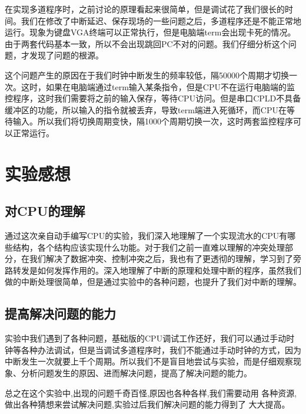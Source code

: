 在实现多道程序时，之前讨论的原理看起来很简单，但是调试花了我们很长的时间。我们在修改了中断延迟、保存现场的一些问题之后，多道程序还是不能正常地运行。现象为键盘VGA终端可以正常执行，但是电脑端term会出现卡死的情况。由于两套代码基本一致，所以不会出现跳回PC不对的问题。我们仔细分析这个问题，才发现了问题的根源。

这个问题产生的原因在于我们时钟中断发生的频率较低，隔50000个周期才切换一次。这时，如果在电脑端通过term输入某条指令，但是CPU不在运行电脑端的监控程序，这时我们需要将之前的输入保存，等待CPU访问。但是串口CPLD不具备缓冲区的功能，所以输入的指令就被丢弃，导致term端进入死循环，而CPU在等待输入。所以我们将切换周期变快，隔1000个周期切换一次，这时两套监控程序可以正常运行。


\section{实验感想}


\subsection{对CPU的理解}

通过这次亲自动手编写CPU的实验，我们深入地理解了一个实现流水的CPU有哪些结构，各个结构应该实现什么功能。对于我们之前一直难以理解的冲突处理部分，在我们解决了数据冲突、控制冲突之后，我也有了更透彻的理解，学习到了旁路转发是如何发挥作用的。深入地理解了中断的原理和处理中断的程序，虽然我们做的中断处理很简单，但是通过实验中的各种问题，也提升了我们对中断的理解。

\subsection{提高解决问题的能力}

实验中我们遇到了各种问题，基础版的CPU调试工作还好，我们可以通过手动时钟等各种办法调试，但是当调试多道程序时，我们不能通过手动时钟的方式，因为中断发生一次就要上千个周期。所以我们不是盲目地尝试与实验，而是仔细观察现象、分析问题发生的原因、进而解决问题，提高了解决问题的能力。

总之在这个实验中,出现的问题千奇百怪,原因也各种各样,我们需要动用 各种资源,做出各种猜想来尝试解决问题,实验过后我们解决问题的能力得到了 大大提高。

